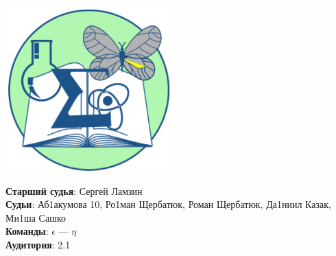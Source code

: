 \documentclass[12pt]{article}
\begin{document}
\begin{minipage}{.30\textwidth}
\begin{center}
\includegraphics[width=0.48\textwidth]{klshlogo.pdf}
\end{center}
\end{minipage}
\begin{minipage}{.65\textwidth}
\begin{flushleft}
{\bf Старший судья}: Сергей Ламзин\\ 
{\bf Судьи}: Аб1акумова 10, Ро1ман Щербатюк, Роман Щербатюк, Да1ниил Казак, Ми1ша Сашко\\ 
{\bf Команды}: $\epsilon$ --- $\eta$\\ 
{\bf Аудитория}: 2.1\\ 
\end{flushleft}
\end{minipage}
\end{document}
